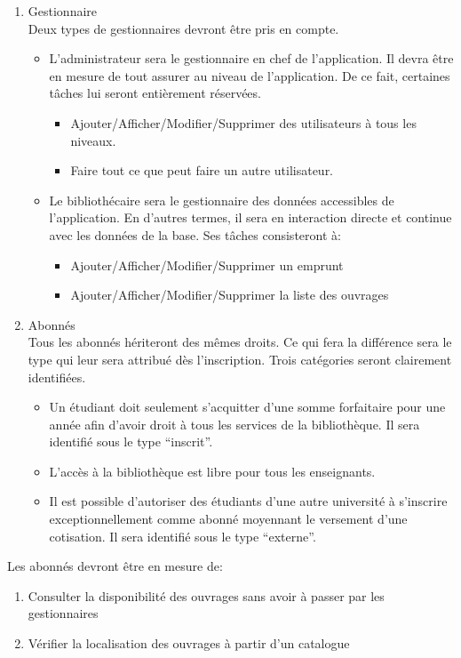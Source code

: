 \begin{enumerate}
    \item Gestionnaire
\\ Deux types de gestionnaires devront être pris en compte.
    \begin{itemize}
        \item L'administrateur sera le gestionnaire en chef
    de l'application. Il devra être en mesure de tout assurer
    au niveau de l'application. De ce fait, certaines tâches
    lui seront entièrement réservées.
        \begin{itemize}
            \item Ajouter/Afficher/Modifier/Supprimer des 
            utilisateurs à tous les niveaux.
            \item Faire tout ce que peut faire un autre utilisateur.
        \end{itemize}
        \item Le bibliothécaire sera le gestionnaire des 
    données accessibles de l’application. En d’autres termes, 
    il sera en interaction directe et continue avec les données 
    de la base. Ses tâches consisteront à:
        \begin{itemize}
            \item Ajouter/Afficher/Modifier/Supprimer un emprunt
            \item Ajouter/Afficher/Modifier/Supprimer la liste des ouvrages
        \end{itemize}
    \end{itemize}

    \item Abonnés
\\ Tous les abonnés hériteront des mêmes droits. Ce qui fera la 
différence sera le type qui leur sera attribué dès 
l’inscription. Trois catégories seront clairement 
identifiées.
    \begin{itemize}
    \item Un étudiant doit seulement s’acquitter d’une somme 
    forfaitaire pour une année afin d’avoir droit à tous les 
    services de la bibliothèque. Il sera identifié sous le type “inscrit”.
    \item L’accès à la bibliothèque est libre pour tous les enseignants.
    \item Il est possible d’autoriser des étudiants d’une autre université à 
    s’inscrire exceptionnellement comme abonné moyennant le versement d’une 
    cotisation. Il sera identifié sous le type “externe”.
    \end{itemize}
\end{enumerate}
\par 
    Les abonnés devront être en mesure de: \par 
\begin{enumerate}
    \item Consulter la disponibilité des ouvrages sans avoir à
     passer par les gestionnaires
    \item Vérifier la localisation des ouvrages à partir d’un catalogue
\end{enumerate}
\par 


